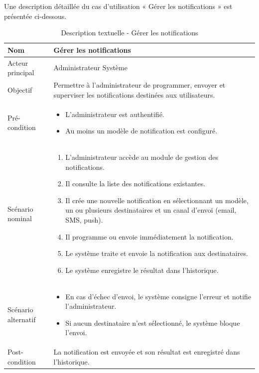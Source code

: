 Une description détaillée du cas d'utilisation « Gérer les notifications » est présentée ci-dessous.

\begin{table}[H]
\centering
\begin{tabular}{ |p{4cm}|p{12cm}|} \hline

Nom & Gérer les notifications \\ \hline

Acteur principal & Administrateur Système \\ \hline

Objectif & Permettre à l'administrateur de programmer, envoyer et superviser les notifications destinées aux utilisateurs. \\ \hline

Pré-condition &
\begin{itemize}
    \item L'administrateur est authentifié.
    \item Au moins un modèle de notification est configuré.
\end{itemize}
\\ \hline

Scénario nominal &
\begin{enumerate}
    \item L'administrateur accède au module de gestion des notifications.
    \item Il consulte la liste des notifications existantes.
    \item Il crée une nouvelle notification en sélectionnant un modèle, un ou plusieurs destinataires et un canal d'envoi (email, SMS, push).
    \item Il programme ou envoie immédiatement la notification.
    \item Le système traite et envoie la notification aux destinataires.
    \item Le système enregistre le résultat dans l'historique.
\end{enumerate}
\\ \hline

Scénario alternatif &
\begin{itemize}
    \item En cas d'échec d'envoi, le système consigne l'erreur et notifie l'administrateur.
    \item Si aucun destinataire n'est sélectionné, le système bloque l'envoi.
\end{itemize}
\\ \hline

Post-condition &
La notification est envoyée et son résultat est enregistré dans l'historique. \\ \hline

\end{tabular}
\caption{Description textuelle - Gérer les notifications}
\label{tab:gerer-notifications}
\end{table}


